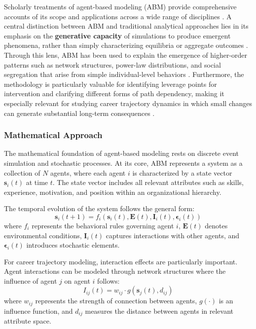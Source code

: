 \documentclass[main.tex]{subfiles}
\begin{document}
Scholarly treatments of agent-based modeling (ABM) provide comprehensive accounts of its scope and applications across a wide range of disciplines \parencite{epstein1996,bonabeau2002}. A central distinction between ABM and traditional analytical approaches lies in its emphasis on the \textbf{generative capacity} of simulations to produce emergent phenomena, rather than simply characterizing equilibria or aggregate outcomes \parencite{epstein2006,miller2007}. Through this lens, ABM has been used to explain the emergence of higher-order patterns such as network structures, power-law distributions, and social segregation that arise from simple individual-level behaviors \parencite{schelling1971,epstein1996}. Furthermore, the methodology is particularly valuable for identifying leverage points for intervention and clarifying different forms of path dependency, making it especially relevant for studying career trajectory dynamics in which small changes can generate substantial long-term consequences \parencite{macy2002,miller2007}.


\subsubsection{Mathematical Approach}

The mathematical foundation of agent-based modeling rests on discrete event simulation and stochastic processes. At its core, ABM represents a system as a collection of $N$ agents, where each agent $i$ is characterized by a state vector $\mathbf{s}_i(t)$ at time $t$\parencite{wikipedia_abm,macal_north}. The state vector includes all relevant attributes such as skills, experience, motivation, and position within an organizational hierarchy.

The temporal evolution of the system follows the general form:
\[
\mathbf{s}_i(t+1) = f_i(\mathbf{s}_i(t), \mathbf{E}(t), \mathbf{I}_i(t), \boldsymbol{\epsilon}_i(t))
\]
where $f_i$ represents the behavioral rules governing agent $i$, $\mathbf{E}(t)$ denotes environmental conditions, $\mathbf{I}_i(t)$ captures interactions with other agents, and $\boldsymbol{\epsilon}_i(t)$ introduces stochastic elements\parencite{macal_north,graduate_attrition}.

For career trajectory modeling, interaction effects are particularly important. Agent interactions can be modeled through network structures where the influence of agent $j$ on agent $i$ follows:
\[
I_{ij}(t) = w_{ij} \cdot g(\mathbf{s}_j(t), d_{ij})
\]
where $w_{ij}$ represents the strength of connection between agents, $g(\cdot)$ is an influence function, and $d_{ij}$ measures the distance between agents in relevant attribute space\parencite{bullinaria_gender}.
\end{document}
